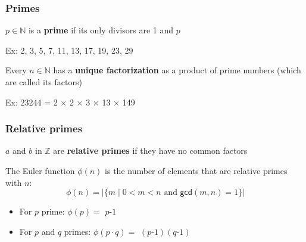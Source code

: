 \documentclass[aspectratio=169, lualatex, 10pt,dvipsnames,svgnames]{beamer} %
\def\envert#1{\textcolor{vert}{#1}}
\begin{document}
\author{}
\date{}

\begin{frame}
  \maketitle
\end{frame}

\begin{frame}
  \frametitle{Primes}

  \begin{definition}
    $p\in\mathbb N$ is a {\bf prime} if its only divisors are 1 and $p$ 
  \end{definition}

  \envert{Ex: 2, 3, 5, 7, 11, 13, 17, 19, 23, 29}
  \bigskip{}
  \bigskip{}

  \begin{theorem}
    Every $n\in\mathbb N$ has a {\bf unique factorization} as a product of prime numbers (which are called its factors)
  \end{theorem}

  \envert{Ex: 23244 = 2 $\times$ 2 $\times$ 3 $\times$ 13 $\times$ 149}
\end{frame}

\begin{frame}
  \frametitle{Relative primes}

  \begin{definition}
    $a$ and $b$ in $\mathbb Z$ are {\bf relative primes} if they have no common factors
  \end{definition}
  \bigskip{}

  \begin{definition}
    The Euler function $\phi(n)$ is the number of elements that are relative primes with $n$:
    \[
    \phi(n) = |\{m \mid 0<m<n \text{ and } \mathsf{gcd}(m,n) = 1\}|
    \]
  \end{definition}
  \pause
  \begin{itemize}
  \item For $p$ prime: $\phi(p) =$ \pause $p\text{-}1$\pause
  \item For $p$ and $q$ primes: $\phi(p\cdot q) =$ \pause $(p\text{-}1)(q\text{-}1)$ 
  \end{itemize}
\end{frame}
\end{document}
